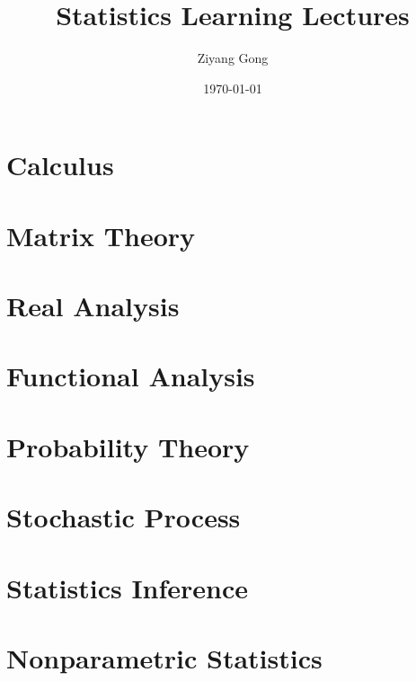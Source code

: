 \documentclass[12pt]{prettybook}
\title{Statistics Learning Lectures}
\author{Ziyang Gong}
\date{\today}
\begin{document}
\frontmatter
\tableofcontents

\mainmatter
\part{Calculus}



\part{Matrix Theory}


\part{Real Analysis}


\part{Functional Analysis}
\part{Probability Theory}






\part{Stochastic Process}




\part{Statistics Inference}





\part{Nonparametric Statistics}


\end{document}
